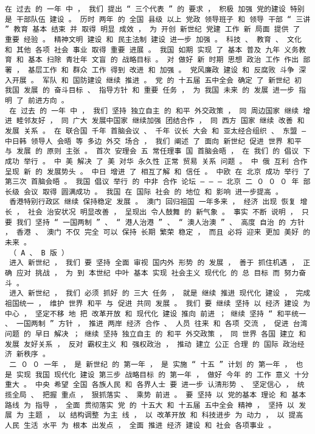 \documentclass{article}
\begin{document}
\begin{Verbatim}[commandchars=\\\{\}]
 在 过去 的 一年 中 ， 我们 提出 “ 三个代表 ” 的 要求 ， 积极 加强 党的建设 特别 是 干部队伍 建设 。 历时 两年 的 全国 县级 以上 党政 领导班子 和 领导 干部 “ 三讲 ” 教育 基本 结束 并 取得 明显 成效 ， 为 开创 新世纪 党建 工作 新 局面 提供 了 重要 经验 。 精神文明 建设 和 民主法制 建设 进一步 加强 。 科技 、 教育 、 文化 和 其他 各项 社会 事业 取得 重要 进展 。 我国 如期 实现 了 基本 普及 九年 义务教育 和 基本 扫除 青壮年 文盲 的 战略目标 。 对 做好 新 时期 思想 政治 工作 作出 部署 ， 基层工作 和 群众 工作 得到 改进 和 加强 。 党风廉政 建设 和 反腐败 斗争 深入开展 。 军队 和 国防建设 继续 推进 。 党 的 十五届 五中全会 确定 了 新世纪 初 我国 发展 的 奋斗目标 、 指导方针 和 重要 任务 ， 为 我国 未来 的 发展 进一步 指明 了 前进方向 。 
 在 过去 的 一年 中 ， 我们 坚持 独立自主 的 和平 外交政策 ， 同 周边国家 继续 增进 睦邻友好 ， 同 广大 发展中国家 继续加强 团结合作 ， 同 西方 国家 继续 改善 和 发展 关系 。 在 联合国 千年 首脑会议 、 千年 议长 大会 和 亚太经合组织 、 东盟 — 中日韩 领导人 会晤 等 多边 外交 场合 ， 我们 阐述 了 面向 新世纪 促进 世界 和平 与 发展 的 原则 主张 。 首次 安理会 五 常任理事 国 首脑会晤 ， 在 我们 的 倡议 下 成功 举行 。 中 美 解决 了 美 对华 永久性 正常 贸易 关系 问题 。 中 俄 互利 合作 呈现 新 的 发展势头 。 中日 增进 了 相互了解 和 信任 。 中欧 在 北京 成功 举行 了 第三次 首脑会晤 。 我国 倡议 举行 的 中非 合作 论坛 — — — 北京 二 ０ ０ ０ 年 部长级 会议 取得 圆满成功 。 我国 在 国际 社会 的 地位 和 影响 进一步提高 。 
 香港特别行政区 继续 保持稳定 发展 。 澳门 回归祖国 一年多来 ， 经济 出现 恢复 增长 ， 社会 治安状况 明显改善 ， 呈现出 令人鼓舞 的 新气象 。 事实 不断 说明 ， 只要 我们 坚持 “ 一国两制 ” 、 “ 港人治港 ” 、 “ 澳人治澳 ” 、 高度 自治 的 方针 ， 香港 、 澳门 不仅 完全 可以 保持 长期 繁荣 稳定 ， 而且 必将 迎来 更加 美好 的 未来 。 
 （ A 、 B 版 ） 
 进入 新世纪 ， 我们 要 坚持 全面 审视 国内外 形势 的 发展 ， 善于 抓住机遇 ， 正确 应对 挑战 ， 为 到 本世纪 中叶 基本 实现 社会主义 现代化 的 总 目标 而 努力奋斗 。 
 进入 新世纪 ， 我们 必须 抓好 的 三大 任务 ， 就是 继续 推进 现代化 建设 ， 完成 祖国统一 ， 维护 世界 和平 与 促进 共同 发展 。 我们 要 继续 坚持 以 经济 建设 为 中心 ， 坚定不移 地 把 改革开放 和 现代化 建设 推向 前进 ； 继续 坚持 “ 和平统一 、 一国两制 ” 方针 ， 推进 两岸 经济 合作 、 人员 往来 和 各项 交流 ， 促进 台湾 问题 的 早日 解决 ； 继续 坚持 独立自主 的 和平 外交政策 ， 同 世界 各国 建立 和 发展 友好关系 ， 反对 霸权主义 和 强权政治 ， 推动 建立 公正 合理 的 国际 政治经济 新秩序 。 
 二 ０ ０ 一年 ， 是 新世纪 的 第一年 ， 是 实施 “ 十五 ” 计划 的 第一年 ， 也 是 实现 我国 现代化 建设 第三步 战略目标 的 第一年 ， 做好 今年 的 工作 意义 十分 重大 。 中央 希望 全国 各族人民 和 各界人士 要 进一步 认清形势 、 坚定信心 ， 统揽全局 、 把握 重点 ， 狠抓落实 、 乘势 前进 。 要 坚持 以 党的基本 理论 和 基本路线 为 指导 ， 全面 贯彻落实 党 的 十五大 和 十五届 五中全会 精神 ， 坚持 以 发展 为 主题 ， 以 结构调整 为主 线 ， 以 改革开放 和 科技进步 为 动力 ， 以 提高 人民 生活 水平 为 根本 出发点 ， 全面 推进 经济 建设 和 社会 各项事业 。 

\end{Verbatim}
\end{document}
